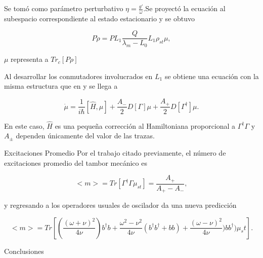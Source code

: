\documentclass[11pt]{beamer}
\begin{document}
\begin{frame}
 Se tomó como parámetro perturbativo $\eta=\frac{g'}{\omega}$.Se proyectó la ecuación al subespacio correspondiente al estado estacionario y se obtuvo

\begin{equation}
P\dot{\rho} = PL_1 \frac{Q}{\lambda_m-L_0}L_1\rho_{st}\mu,
\end{equation}

$\mu$ representa a $Tr_c[P\rho]$
\end{frame}

\begin{frame}

Al desarrollar los conmutadores involucrados en $L_1$ se obtiene una ecuación con la misma estructura que en \cite{BarberisLC} y se llega a

\begin{equation}
\dot{\mu} = \frac{1}{i\hbar}[\hat{H},\mu] + \frac{A_-}{2}D[\Gamma]\mu + \frac{A_+}{2}D[\Gamma^\dagger]\mu.
\end{equation}

En este caso, $\hat{H}$ es una pequeña corrección al Hamiltoniana proporcional a $\Gamma^\dagger \Gamma$ y $A_\pm$ dependen únicamente del valor de las trazas.

\end{frame}

\begin{frame}{Excitaciones Promedio}
Por el trabajo citado previamente, el número de excitaciones promedio del tambor mecánico es

\begin{equation}
<m> = Tr[\Gamma^\dagger \Gamma \mu_{st}] = \frac{A_+}{A_+ - A_-},
\end{equation}

y regresando a los operadores usuales de oscilador da una nueva predicción

\begin{equation}
<m> = Tr[(\frac{(\omega + \nu )^2}{4\nu})b^\dagger b +\frac{\omega^2 - \nu^2}{4\nu}(b^\dagger b^\dagger +bb) +\frac{(\omega - \nu )^2}{4\nu}) b b^\dagger)\mu_st].
\end{equation}

\end{frame}

\begin{frame}{Conclusiones}



\end{frame}



\end{document}
